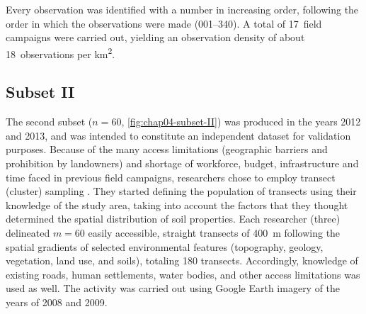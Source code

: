 Every observation was identified with a number in increasing order, following the order in which the 
observations were made (\num{001}--\num{340}). A total of \num{17}~field campaigns were carried out, yielding 
an observation density of about \num{18}~observations per \si{\kilo\metre\squared}.

\subsection{Subset II}
\label{sec:chap04-subset-ii}

The second subset ($n = 60$, \autoref{fig:chap04-subset-II}) was produced in the years \num{2012} and 
\num{2013}, and was intended to constitute an independent dataset for validation purposes. Because of the many 
access limitations (geographic barriers and prohibition by landowners) and shortage of workforce, budget, 
infrastructure and time faced in previous field campaigns, researchers chose to employ transect (cluster) 
sampling \cite{MiguelEtAl2012, Moura-BuenoEtAl2012, Samuel-RosaEtAl2013}. They started defining the population 
of transects using their knowledge of the study area, taking into account the factors that they thought 
determined the spatial distribution of soil properties. Each researcher (three) delineated $m = 60$ easily 
accessible, straight transects of \SI{400}{\metre} following the spatial gradients of selected environmental 
features (topography, geology, vegetation, land use, and soils), totaling 180 transects. Accordingly, 
knowledge of existing roads, human settlements, water bodies, and other access limitations was used as well. 
The activity was carried out using Google Earth\rr{} imagery of the years of \num{2008} and \num{2009}.

